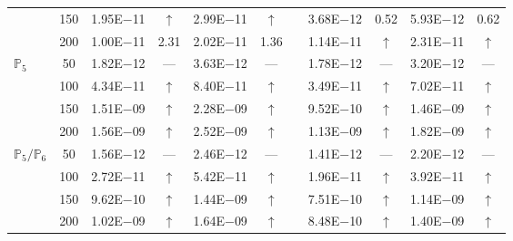 \begin{table}[H]
{\begin{tabular}{@{}l c c c c c c c c c c@{}}
 & 150 & 1.95E$-$11 & $\uparrow$  & 2.99E$-$11 & $\uparrow$ &  & 3.68E$-$12 & 0.52 & 5.93E$-$12 & 0.62\\
 & 200 & 1.00E$-$11 & 2.31  & 2.02E$-$11 & 1.36 &  & 1.14E$-$11 & $\uparrow$ & 2.31E$-$11 & $\uparrow$\\
\midrule
\multirow{4}{*}{$\mathbb{P}_{5}$}
 & 50 & 1.82E$-$12 & ---  & 3.63E$-$12 & --- &  & 1.78E$-$12 & --- & 3.20E$-$12 & ---\\
 & 100 & 4.34E$-$11 & $\uparrow$  & 8.40E$-$11 & $\uparrow$ &  & 3.49E$-$11 & $\uparrow$ & 7.02E$-$11 & $\uparrow$\\
 & 150 & 1.51E$-$09 & $\uparrow$  & 2.28E$-$09 & $\uparrow$ &  & 9.52E$-$10 & $\uparrow$ & 1.46E$-$09 & $\uparrow$\\
 & 200 & 1.56E$-$09 & $\uparrow$  & 2.52E$-$09 & $\uparrow$ &  & 1.13E$-$09 & $\uparrow$ & 1.82E$-$09 & $\uparrow$\\
\midrule
\multirow{4}{*}{$\mathbb{P}_{5}/\mathbb{P}_{6}$}
 & 50 & 1.56E$-$12 & ---  & 2.46E$-$12 & --- &  & 1.41E$-$12 & --- & 2.20E$-$12 & ---\\
 & 100 & 2.72E$-$11 & $\uparrow$  & 5.42E$-$11 & $\uparrow$ &  & 1.96E$-$11 & $\uparrow$ & 3.92E$-$11 & $\uparrow$\\
 & 150 & 9.62E$-$10 & $\uparrow$  & 1.44E$-$09 & $\uparrow$ &  & 7.51E$-$10 & $\uparrow$ & 1.14E$-$09 & $\uparrow$\\
 & 200 & 1.02E$-$09 & $\uparrow$  & 1.64E$-$09 & $\uparrow$ &  & 8.48E$-$10 & $\uparrow$ & 1.40E$-$09 & $\uparrow$\\
\bottomrule
\end{tabular}}
\label{none}
\end{table}
